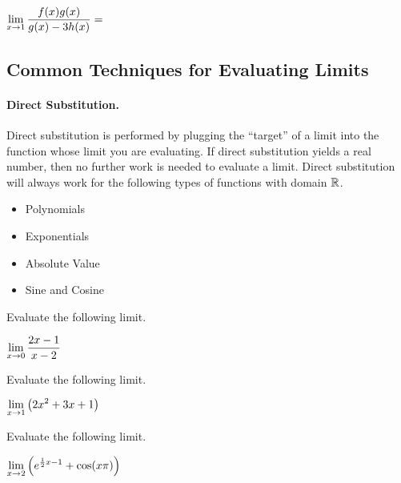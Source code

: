 \documentclass[12pt]{article}
\begin{document}
\vspace{10mm}

\hspace{10mm} $\displaystyle\lim_{x\to 1}\frac{f(x)g(x)}{g(x)-3h(x)}=$

\newpage

\subsection*{Common Techniques for Evaluating Limits}

\paragraph{Direct Substitution.} Direct substitution is performed by plugging the ``target'' of a limit into the function whose limit you are evaluating. If direct substitution yields a real number, then no further work is needed to evaluate a limit. Direct substitution will always work for the following types of functions with domain $\mathbb{R}$. 
\begin{itemize}
	\item Polynomials
	\item Exponentials
	\item Absolute Value
	\item Sine and Cosine
\end{itemize}

\vspace{2mm}

\Example Evaluate the following limit.

\vspace{5mm}

\hspace{10mm} $\displaystyle\lim_{x\to 0}\frac{2x-1}{x-2}$

\vspace{25mm}

\Example Evaluate the following limit.

\vspace{5mm}

\hspace{10mm} $\displaystyle\lim_{x\to 1}\left( 2x^2+3x+1\right)$

\vspace{25mm}

\Example Evaluate the following limit.

\vspace{5mm}

\hspace{10mm} $\displaystyle\lim_{x\to 2}\left( e^{\frac{1}{2}x-1}+\cos(x\pi)\right)$
\end{document}
